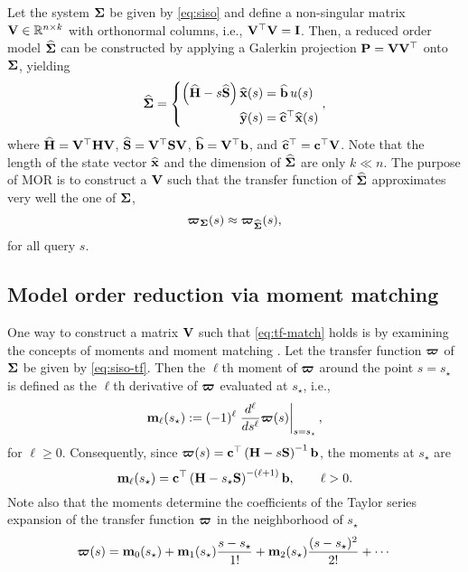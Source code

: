 Let the system $\mathbf{\Sigma}$ be given by \eqref{eq:siso} and define a non-singular matrix $\bV \inR[n][k]$ with orthonormal columns, i.e., $\mathbf{V}^\top \mathbf{V} = \mathbf{I}$. Then, a reduced order model $\widehat{\mathbf{\Sigma}}$ can be constructed by applying a Galerkin projection $\mathbf{P} = \mathbf{V}\mathbf{V}^\top$ onto $\mathbf{\Sigma}$, yielding
\begin{equation}
  \widehat{\mathbf{\Sigma}} = \left\{\begin{aligned}
    \left( \widehat{\mathbf{H}} - s\widehat{\mathbf{S}} \right) \widehat{\mathbf{x}}(s) &= \widehat{\mathbf{b}}\,u(s) \\
                                \widehat{\mathbf{y}}(s) &= \widehat{\mathbf{c}}^\top \widehat{\mathbf{x}}(s)
  \end{aligned}\right.,
\end{equation}
where $\widehat{\mathbf{H}} = \mathbf{V}^\top \mathbf{H} \mathbf{V}$, $\widehat{\mathbf{S}} = \mathbf{V}^\top \mathbf{S} \mathbf{V}$, $\widehat{\mathbf{b}} = \mathbf{V}^\top \mathbf{b}$, and $\widehat{\mathbf{c}}^\top = \mathbf{c}^\top \mathbf{V}$. Note that the length of the state vector $\widehat{\mathbf{x}}$ and the dimension of $\widehat{\mathbf{\Sigma}}$ are only $k \ll n$. The purpose of MOR is to construct a $\mathbf{V}$ such that the transfer function of $\widehat{\mathbf{\Sigma}}$ approximates very well the one of $\mathbf{\Sigma}$,
\begin{equation}
  \boldsymbol{\varpi}_{\mathbf{\Sigma}}(s) \approx \boldsymbol{\varpi}_{\widehat{\mathbf{\Sigma}}}(s),
  \label{eq:tf-match}
\end{equation}
for all query $s$.

\subsection{Model order reduction via moment matching}
\label{lds:mm}

One way to construct a matrix $\mathbf{V}$ such that \eqref{eq:tf-match} holds is by examining the concepts of moments and moment matching \cite{Antoulas2005}. Let the transfer function $\boldsymbol{\varpi}$ of $\mathbf{\Sigma}$ be given by \eqref{eq:siso-tf}. Then the $\ell$th moment of $\boldsymbol{\varpi}$ around the point $s = s_\star$ is defined as the $\ell$th derivative of $\boldsymbol{\varpi}$ evaluated at $s_\star$, i.e.,
\begin{equation}
  \mathbf{m}_\ell(s_\star) := (-1)^\ell \left.\frac{d^\ell}{ds^\ell} \boldsymbol{\varpi}(s) \right|_{s=s_\star},
  \label{eq:moment}
\end{equation}
for $\ell \geq 0$. Consequently, since $\boldsymbol{\varpi}(s) = \mathbf{c}^\top \left( \mathbf{H} - s\mathbf{S} \right)^{-1} \mathbf{b}$, the moments at $s_\star$ are
$$
  \mathbf{m}_\ell(s_\star) = \mathbf{c}^\top \left( \mathbf{H} - s_\star \mathbf{S} \right)^{-(\ell+1)} \mathbf{b}, \qquad \ell > 0.
$$
Note also that the moments determine the coefficients of the Taylor series expansion of the transfer function $\boldsymbol{\varpi}$ in the neighborhood of $s_\star$
\begin{equation}
  \boldsymbol{\varpi}(s) = \mathbf{m}_0(s_\star) + \mathbf{m}_1(s_\star) \frac{s - s_\star}{1!} + \mathbf{m}_2(s_\star) \frac{(s - s_\star)^2}{2!} + \cdots
\end{equation}

